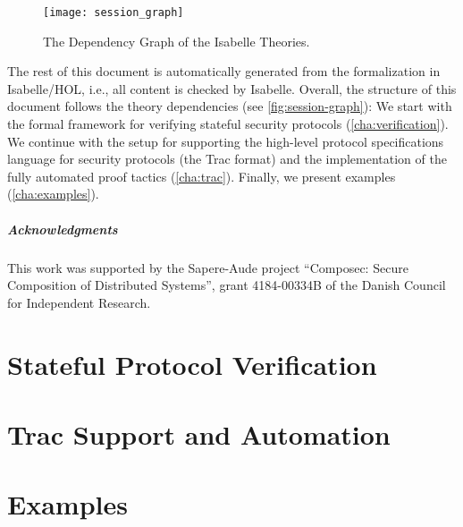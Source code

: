 \documentclass[10pt,DIV16,a4paper,abstract=true,twoside=semi,openright]
{scrreprt}
\begin{document}
  \begin{figure}
    \centering
    \texttt{[image: session\_graph]}
    \caption{The Dependency Graph of the Isabelle Theories.\label{fig:session-graph}}
  \end{figure}
  The rest of this document is automatically generated from the
  formalization in Isabelle/HOL, i.e., all content is checked by
  Isabelle.  Overall, the structure of this document follows the
  theory dependencies (see \autoref{fig:session-graph}): We start with
  the formal framework for verifying stateful security protocols
  (\autoref{cha:verification}). We continue with the setup for
  supporting the high-level protocol specifications language for
  security protocols (the Trac format) and the implementation of the
  fully automated proof tactics (\autoref{cha:trac}). Finally, we
  present examples (\autoref{cha:examples}).

\paragraph{Acknowledgments}
This work was supported by the Sapere-Aude project ``Composec: Secure Composition of Distributed Systems'', grant 4184-00334B of the Danish Council for Independent Research.

\clearpage

\chapter{Stateful Protocol Verification}
\label{cha:verification}







\chapter{Trac Support and Automation}
\label{cha:trac}







\chapter{Examples}
\label{cha:examples}







% 


{\small
  
  
}
\end{document}
